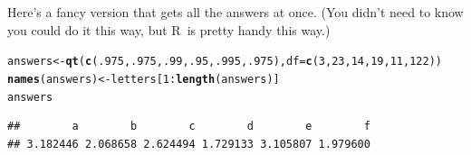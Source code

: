 \documentclass[twoside]{book}\usepackage[]{graphicx}\usepackage[]{xcolor}
\makeatletter
\newcommand{\hlnum}[1]{\textcolor[rgb]{0.686,0.059,0.569}{#1}}%
\newcommand{\hlopt}[1]{\textcolor[rgb]{0,0,0}{#1}}%
\newcommand{\hlstd}[1]{\textcolor[rgb]{0.345,0.345,0.345}{#1}}%
\newcommand{\hlkwb}[1]{\textcolor[rgb]{0.69,0.353,0.396}{#1}}%
\newcommand{\hlkwc}[1]{\textcolor[rgb]{0.333,0.667,0.333}{#1}}%
\newcommand{\hlkwd}[1]{\textcolor[rgb]{0.737,0.353,0.396}{\textbf{#1}}}%
\newenvironment{kframe}{%
 \def\at@end@of@kframe{}%
 \ifinner\ifhmode%
  \def\at@end@of@kframe{\end{minipage}}%
  \begin{minipage}{\columnwidth}%
 \fi\fi%
 \def\FrameCommand##1{\hskip\@totalleftmargin \hskip-\fboxsep
 \colorbox{shadecolor}{##1}\hskip-\fboxsep
     \hskip-\linewidth \hskip-\@totalleftmargin \hskip\columnwidth}%
 \MakeFramed {\advance\hsize-\width
   \@totalleftmargin\z@ \linewidth\hsize
   \@setminipage}}%
 {\par\unskip\endMakeFramed%
 \at@end@of@kframe}
\newenvironment{knitrout}{}{} %
\def\R{{\sf R}}
\makeatother
\begin{document}
\begin{solution}
Here's a fancy version that gets all the answers at once.  (You didn't need to know
you could do it this way, but \R\ is pretty handy this way.)
\begin{knitrout}
\color{fgcolor}\begin{kframe}
\begin{alltt}
\hlstd{answers} \hlkwb{<-} \hlkwd{qt}\hlstd{(} \hlkwd{c}\hlstd{(}\hlnum{.975}\hlstd{,} \hlnum{.975}\hlstd{,} \hlnum{.99}\hlstd{,} \hlnum{.95}\hlstd{,} \hlnum{.995}\hlstd{,} \hlnum{.975}\hlstd{),} \hlkwc{df}\hlstd{=}\hlkwd{c}\hlstd{(}\hlnum{3}\hlstd{,}\hlnum{23}\hlstd{,}\hlnum{14}\hlstd{,}\hlnum{19}\hlstd{,}\hlnum{11}\hlstd{,}\hlnum{122}\hlstd{))}
\hlkwd{names}\hlstd{(answers)} \hlkwb{<-} \hlstd{letters[}\hlnum{1}\hlopt{:}\hlkwd{length}\hlstd{(answers)]}
\hlstd{answers}
\end{alltt}
\begin{verbatim}
##        a        b        c        d        e        f 
## 3.182446 2.068658 2.624494 1.729133 3.105807 1.979600
\end{verbatim}
\end{kframe}
\end{knitrout}
\end{solution}
\end{document}

